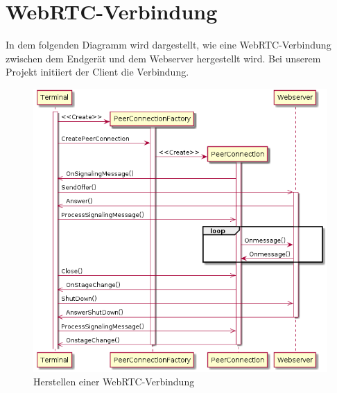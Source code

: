 \documentclass[entwurf.tex]{subfiles}
\begin{document}
  	\section{WebRTC-Verbindung}
  	\label{Sequence:WebRTCConnect}
		In dem folgenden Diagramm wird dargestellt, wie eine WebRTC-Verbindung zwischen dem Endgerät und dem Webserver hergestellt wird. Bei unserem Projekt initiiert der Client die Verbindung.
		
		\begin{figure}[H]
			\begin{center}
	 			\includegraphics[width=\textwidth]{diagrams/DataTransferSequenz.png}
  				\caption{Herstellen einer WebRTC-Verbindung}
  			\end{center}
  		\end{figure}
  		
  	\newpage
\end{document}
